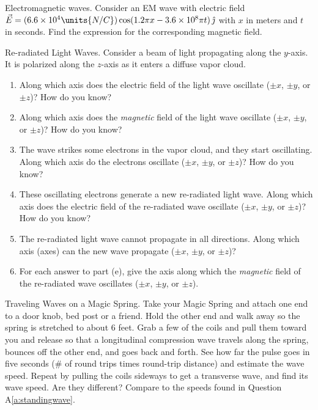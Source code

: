 \begin{aproblem}{Electromagnetic waves.} 
  Consider an EM wave with electric field $\vec{E} = (6.6 \times
  10^4\units{N/C})\cos(1.2\pi x - 3.6 \times 10^8 \pi t)\,
  \hat{\jmath}$ with $x$ in meters and $t$ in seconds.  Find the
  expression for the corresponding magnetic field.
\end{aproblem}

\newpage

\begin{aproblem}{Re-radiated Light Waves.}  
  Consider a beam of light propagating along the $y$-axis.  It is
  polarized along the $z$-axis as it enters a diffuse vapor cloud.
  \begin{enumerate}
  \item Along which axis does the electric field of the light wave
    oscillate ($\pm x$, $\pm y$, or $\pm z$)?  How do you know?
  \item Along which axis does the {\it magnetic} field of the light
    wave oscillate ($\pm x$, $\pm y$, or $\pm z$)?  How do you know?
  \item The wave strikes some electrons in the vapor cloud, and they
    start oscillating.  Along which axis do the electrons oscillate
    ($\pm x$, $\pm y$, or $\pm z$)?  How do you know?
  \item These oscillating electrons generate a new re-radiated light
    wave. Along which axis does the electric field of the re-radiated
    wave oscillate ($\pm x$, $\pm y$, or $\pm z$)?  How do you know?
  \item The re-radiated light wave cannot propagate in all directions.
    Along which axis (axes) can the new wave propagate ($\pm x$, $\pm
    y$, or $\pm z$)?
  \item For each answer to part (e), give the axis along which the
    {\it magnetic} field of the re-radiated wave oscillates ($\pm x$,
    $\pm y$, or $\pm z$).
  \end{enumerate}
  \label{prob:reradiation}
\end{aproblem}


\begin{aproblem}{Traveling Waves on a Magic Spring.} 
  Take your Magic Spring and attach one end to a door knob, bed post
  or a friend.  Hold the other end and walk away so the spring is
  stretched to about 6 feet.  Grab a few of the coils and pull them
  toward you and release so that a longitudinal compression wave
  travels along the spring, bounces off the other end, and goes back
  and forth.  See how far the pulse goes in five seconds (\# of round
  trips times round-trip distance) and estimate the wave speed.
  Repeat by pulling the coils sideways to get a transverse wave, and
  find its wave speed.  Are they different?  Compare to the speeds
  found in Question A\ref{a:standingwave}. \label{a:travwave}
\end{aproblem}



